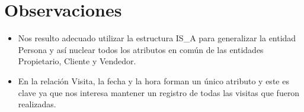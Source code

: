 \documentclass[11pt]{article}
\begin{document}
\section*{Observaciones}

\begin{itemize}
    \item Nos resulto adecuado utilizar la estructura IS\_A para generalizar la entidad Persona y así nuclear todos los atributos en común de las entidades Propietario, Cliente y Vendedor.
    \item En la relación Visita, la fecha y la hora forman un único atributo y este es clave ya que nos interesa mantener un registro de todas las visitas que fueron realizadas.
\end{itemize}
\end{document}

